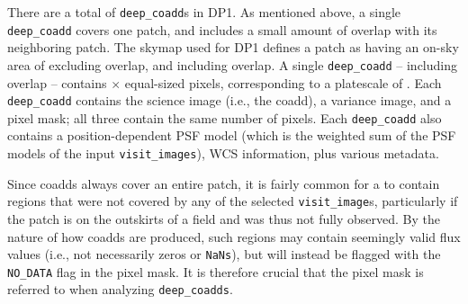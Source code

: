 \begin{itemize}
There are a total of \ndeepcoadds \texttt{deep\_coadd}s in \gls{DP1}.
As mentioned above, a single \texttt{deep\_coadd} covers one \gls{patch}, and includes a small amount of overlap with its neighboring \gls{patch}.
The skymap used for \gls{DP1} defines a patch as having an on-sky area of \innerpatcharea excluding overlap, and \outerpatcharea including overlap. A single \texttt{deep\_coadd} -- including overlap -- contains \ndeepcoaddpixx $\times$ \ndeepcoaddpixy equal-sized pixels, corresponding to a platescale of \rawplatescale.
Each \texttt{deep\_coadd} contains the science image (i.e., the coadd), a variance image, and a pixel mask; all three contain the same number of pixels.
Each \texttt{deep\_coadd} also contains a position-dependent PSF model (which is the weighted sum of the PSF models of the input \texttt{visit\_images}), \gls{WCS} information, plus various metadata.

Since coadds always cover an entire patch, it is fairly common for a  to contain regions that were not covered by any of the selected \texttt{visit\_image}s, particularly if the patch is on the outskirts of a field and was thus not fully observed. By the nature of how coadds are produced, such regions may contain seemingly valid \gls{flux} values (i.e., not necessarily zeros or \texttt{NaNs}), but will instead be flagged with the \texttt{NO\_DATA} flag in the pixel mask. It is therefore crucial that the pixel mask is referred to when analyzing \texttt{deep\_coadds}.



\end{itemize}
